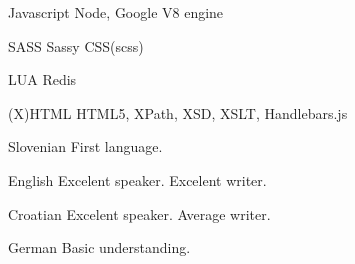 \begin{cvskills}
\cvskill
{Javascript} %
{Node, Google V8 engine} %

\cvskill
{SASS} %
{Sassy CSS(scss)} %

\cvskill
{LUA} %
{Redis} %

\cvskill
{(X)HTML} %
{HTML5, XPath, XSD, XSLT, Handlebars.js} %
\end{cvskills}




\begin{cvskills}


\cvskill
{Slovenian} %
{First language.} %


\cvskill
{English} %
{Excelent speaker. Excelent writer.} %


\cvskill
{Croatian} %
{Excelent speaker. Average writer.} %


\cvskill
{German} %
{Basic understanding.} %

\end{cvskills}


